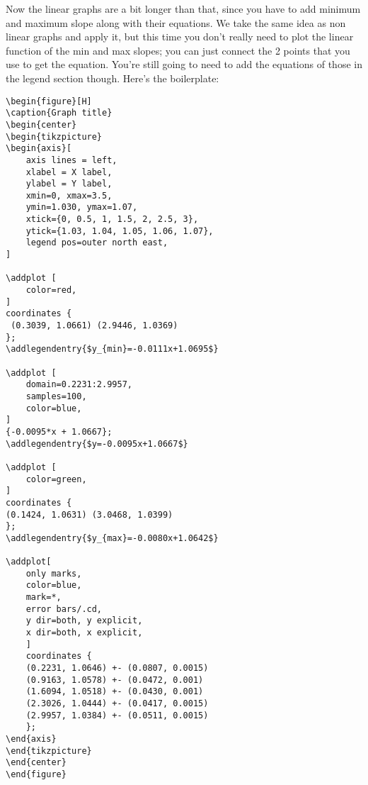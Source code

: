 Now the linear graphs are a bit longer than that,
since you have to add minimum and maximum slope along with their equations.
We take the same idea as non linear graphs and apply it,
but this time you don't really need to plot the linear function of the min and max slopes;
you can just connect the 2 points that you use to get the equation.
You're still going to need to add the equations of those in the legend section though.
Here's the boilerplate:

\begin{verbatim}
\begin{figure}[H]
\caption{Graph title}
\begin{center}
\begin{tikzpicture}
\begin{axis}[
    axis lines = left,
    xlabel = X label,
    ylabel = Y label,
    xmin=0, xmax=3.5,
    ymin=1.030, ymax=1.07,
    xtick={0, 0.5, 1, 1.5, 2, 2.5, 3},
    ytick={1.03, 1.04, 1.05, 1.06, 1.07},
    legend pos=outer north east,
]

\addplot [
    color=red,
]
coordinates {
 (0.3039, 1.0661) (2.9446, 1.0369)
};
\addlegendentry{$y_{min}=-0.0111x+1.0695$}

\addplot [
    domain=0.2231:2.9957, 
    samples=100, 
    color=blue,
]
{-0.0095*x + 1.0667};
\addlegendentry{$y=-0.0095x+1.0667$}

\addplot [
    color=green,
]
coordinates {
(0.1424, 1.0631) (3.0468, 1.0399)
};
\addlegendentry{$y_{max}=-0.0080x+1.0642$}
 
\addplot[
    only marks,
    color=blue,
    mark=*,
    error bars/.cd,
    y dir=both, y explicit,
    x dir=both, x explicit,
    ]
    coordinates {
    (0.2231, 1.0646) +- (0.0807, 0.0015)
    (0.9163, 1.0578) +- (0.0472, 0.001)
    (1.6094, 1.0518) +- (0.0430, 0.001)
    (2.3026, 1.0444) +- (0.0417, 0.0015)
    (2.9957, 1.0384) +- (0.0511, 0.0015)
    };
\end{axis}
\end{tikzpicture}
\end{center}
\end{figure}
\end{verbatim}


